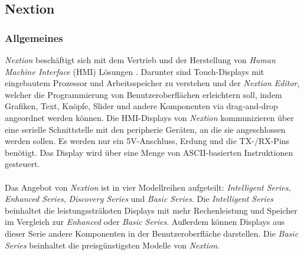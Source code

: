 \subsection{Nextion}
\subsubsection{Allgemeines}
\textit{Nextion} beschäftigt sich mit dem Vertrieb und der Herstellung von \textit{Human Machine Interface} (HMI) Lösungen \cite{zhou_home_nodate}. Darunter sind Touch-Displays mit eingebautem Prozessor und Arbeitsspeicher zu verstehen und der \textit{Nextion Editor}, welcher die Programmierung von Benutzeroberflächen erleichtern soll, indem Grafiken, Text, Knöpfe, Slider und andere Komponenten via drag-and-drop angeordnet werden können. Die HMI-Displays von \textit{Nextion} kommunizieren über eine serielle Schnittstelle mit den peripherie Geräten, an die sie angeschlossen werden sollen. Es werden nur ein 5V-Anschluss, Erdung und die TX-/RX-Pins benötigt. Das Display wird über eine Menge von ASCII-basierten Instruktionen gesteuert.\\\\
Das Angebot von \textit{Nextion} ist in vier Modellreihen aufgeteilt: \textit{Intelligent Series}, \textit{Enhanced Series}, \textit{Discovery Series} und \textit{Basic Series}. Die \textit{Intelligent Series} beinhaltet die leistungssträksten Displays mit mehr Rechenleistung und Speicher im Vergleich zur \textit{Enhanced} oder \textit{Basic Series}. Außerdem können Displays aus dieser Serie andere Komponenten in der Benutzeroberfläche darstellen. Die \textit{Basic Series} beinhaltet die preisgünstigsten Modelle von \textit{Nextion}.
